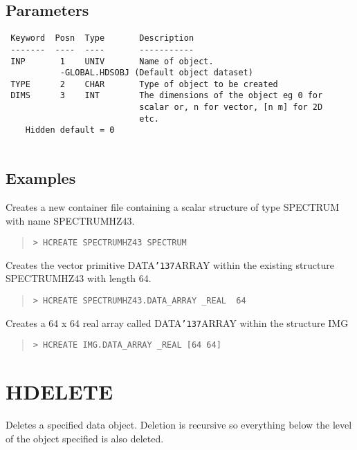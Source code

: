 \documentclass{book}
\renewcommand{\_}{{\tt\char'137}}     %
\begin{document}
\subsection{Parameters}
\begin{verbatim}
 Keyword  Posn  Type       Description
 -------  ----  ----       -----------
 INP       1    UNIV       Name of object.
           -GLOBAL.HDSOBJ (Default object dataset)
 TYPE      2    CHAR       Type of object to be created
 DIMS      3    INT        The dimensions of the object eg 0 for
                           scalar or, n for vector, [n m] for 2D
                           etc.
    Hidden default = 0
 
\end{verbatim}\subsection{Examples}
Creates a new container file containing a scalar structure
of type SPECTRUM with name SPECTRUMHZ43.
\begin{quote}\begin{verbatim}
> HCREATE SPECTRUMHZ43 SPECTRUM
\end{verbatim}\end{quote}
Creates the vector primitive DATA\_ARRAY within the existing
structure SPECTRUMHZ43 with length 64.
\begin{quote}\begin{verbatim}
> HCREATE SPECTRUMHZ43.DATA_ARRAY _REAL  64
\end{verbatim}\end{quote}
Creates a 64 x 64 real array called DATA\_ARRAY within the
structure IMG
\begin{quote}\begin{verbatim}
> HCREATE IMG.DATA_ARRAY _REAL [64 64]
\end{verbatim}\end{quote}
\section{HDELETE}
Deletes a specified data object. Deletion is recursive so
everything below the level of the object specified is also
deleted.
 
\end{document}
